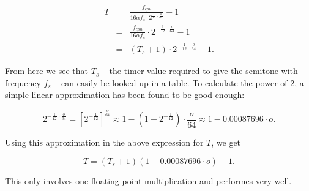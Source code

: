 \documentclass{article}
\begin{document}
\begin{eqnarray*}
  T &=& \frac{f_{cpu}}{16 \alpha f_{s} \cdot 2^{\frac{1}{12} \cdot \frac{o}{64}}} - 1\\
  &=& \frac{f_{cpu}}{16 \alpha f_s} \cdot 2^{-\frac{1}{12} \cdot \frac{o}{64}} - 1\\
  &=& (T_s + 1) \cdot 2^{-\frac{1}{12} \cdot \frac{o}{64}} - 1.
\end{eqnarray*}

From here we see that $T_s$ -- the timer value required to give the semitone with frequency $f_s$ -- can easily be looked up in a table. To calculate the power of 2, a simple linear approximation has been found to be good enough:

$$2^{-\frac{1}{12} \cdot \frac{o}{64}} = [2^{-\frac{1}{12}}]^{\frac{o}{64}} \approx 1 - (1 - 2^{-\frac{1}{12}}) \cdot \frac{o}{64} \approx 1 - 0.00087696 \cdot o.$$

Using this approximation in the above expression for $T$, we get

$$T = (T_s + 1) (1 - 0.00087696 \cdot o) - 1.$$

This only involves one floating point multiplication and performes very well. 
\end{document}
